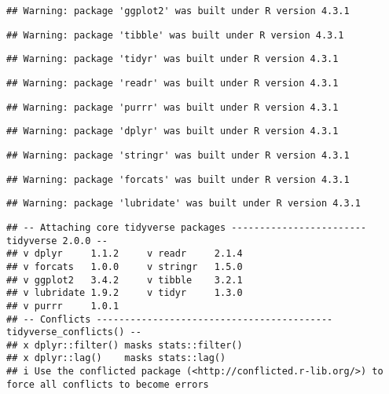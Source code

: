 \documentclass[
]{article}
\begin{document}
\begin{verbatim}
## Warning: package 'ggplot2' was built under R version 4.3.1
\end{verbatim}

\begin{verbatim}
## Warning: package 'tibble' was built under R version 4.3.1
\end{verbatim}

\begin{verbatim}
## Warning: package 'tidyr' was built under R version 4.3.1
\end{verbatim}

\begin{verbatim}
## Warning: package 'readr' was built under R version 4.3.1
\end{verbatim}

\begin{verbatim}
## Warning: package 'purrr' was built under R version 4.3.1
\end{verbatim}

\begin{verbatim}
## Warning: package 'dplyr' was built under R version 4.3.1
\end{verbatim}

\begin{verbatim}
## Warning: package 'stringr' was built under R version 4.3.1
\end{verbatim}

\begin{verbatim}
## Warning: package 'forcats' was built under R version 4.3.1
\end{verbatim}

\begin{verbatim}
## Warning: package 'lubridate' was built under R version 4.3.1
\end{verbatim}

\begin{verbatim}
## -- Attaching core tidyverse packages ------------------------ tidyverse 2.0.0 --
## v dplyr     1.1.2     v readr     2.1.4
## v forcats   1.0.0     v stringr   1.5.0
## v ggplot2   3.4.2     v tibble    3.2.1
## v lubridate 1.9.2     v tidyr     1.3.0
## v purrr     1.0.1     
## -- Conflicts ------------------------------------------ tidyverse_conflicts() --
## x dplyr::filter() masks stats::filter()
## x dplyr::lag()    masks stats::lag()
## i Use the conflicted package (<http://conflicted.r-lib.org/>) to force all conflicts to become errors
\end{verbatim}
\end{document}
